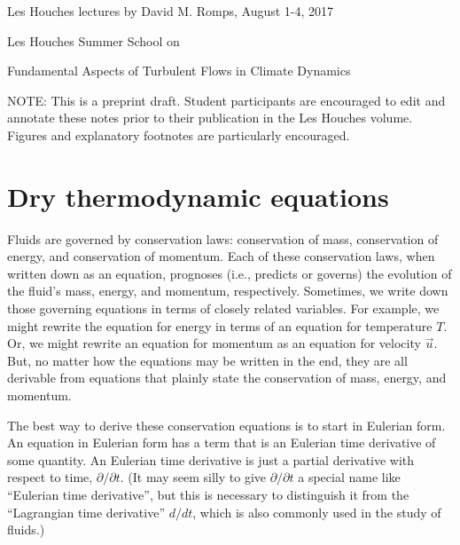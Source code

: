 \documentclass[12pt]{article}
\begin{document}
\begin{center}
{\large Les Houches lectures by David M. Romps, August 1-4, 2017}

\vspace{1cm}

Les Houches Summer School on

Fundamental Aspects of Turbulent Flows in Climate Dynamics

\vspace{1cm}

NOTE: This is a preprint draft.  Student participants are encouraged to edit and annotate these notes prior to their publication in the Les Houches volume.  Figures and explanatory footnotes are particularly encouraged.
\end{center}

\tableofcontents


\section{Dry thermodynamic equations}


Fluids are governed by conservation laws: conservation of mass, conservation of energy, and conservation of momentum.  Each of these conservation laws, when written down as an equation, prognoses (i.e., predicts or governs) the evolution of the fluid's mass, energy, and momentum, respectively.  Sometimes, we write down those governing equations in terms of closely related variables.  For example, we might rewrite the equation for energy in terms of an equation for temperature $T$.  Or, we might rewrite an equation for momentum as an equation for velocity $\vec{u}$.  But, no matter how the equations may be written in the end, they are all derivable from equations that plainly state the conservation of mass, energy, and momentum.


The best way to derive these conservation equations is to start in Eulerian form.  An equation in Eulerian form has a term that is an Eulerian time derivative of some quantity.  An Eulerian time derivative is just a partial derivative with respect to time, $\partial/\partial t$.  (It may seem silly to give $\partial/\partial t$ a special name like ``Eulerian time derivative'', but this is necessary to distinguish it from the ``Lagrangian time derivative'' $d/dt$, which is also commonly used in the study of fluids.)
\end{document}
